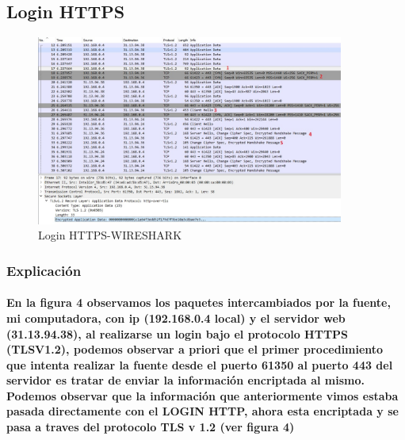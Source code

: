 \documentclass[letterpaper]{article}
\begin{document}
\subsection{Login HTTPS}

\begin{figure}
	\centering
	\includegraphics[width=0.9\textwidth]{img/https-login-1.jpg}
	\caption{Login HTTPS-WIRESHARK}
	\label{figura 4}
\end{figure}	

\subsubsection{Explicación}
\paragraph{En la figura 4 observamos los paquetes intercambiados por la fuente, mi computadora, con ip (192.168.0.4 local) y el servidor web (31.13.94.38), al realizarse un login bajo el protocolo HTTPS (TLSV1.2), podemos observar a priori que el primer procedimiento que intenta realizar la fuente desde el puerto 61350 al puerto 443 del servidor es tratar de enviar la información encriptada al mismo. Podemos observar que la información que anteriormente vimos estaba pasada directamente con el LOGIN HTTP, ahora esta encriptada y se pasa a traves del protocolo TLS v 1.2 (ver figura 4)}
\end{document}
